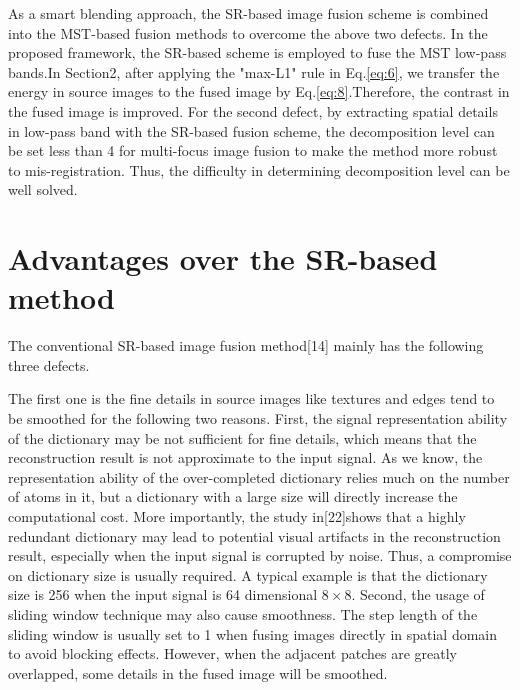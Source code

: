 As a smart blending approach, the SR-based image fusion
scheme is combined into the MST-based fusion methods to
overcome the above two defects. In the proposed framework, the
SR-based scheme is employed to fuse the MST low-pass bands.In
Section2, after applying the "max-L1" rule in Eq.\ref{eq:6}, we transfer the energy in source images to the fused image by Eq.\ref{eq:8}.Therefore, the contrast in the fused image is improved. For the second defect, by extracting spatial details in low-pass band with the SR-based fusion scheme, the decomposition level can be set less than 4 for multi-focus image fusion to make the method more robust to mis-registration. Thus, the difficulty in determining decomposition level can be well solved.

\section{Advantages over the SR-based method}
The conventional SR-based image fusion method[14] mainly
has the following three defects.\hfill \break

The first one is the fine details in source images like textures and edges tend to be smoothed for the following two reasons. First, the signal representation ability of the dictionary may be not sufficient for fine details, which means that the reconstruction result is not approximate to the input signal. As we know, the representation ability of the over-completed dictionary relies much on the number of atoms in it, but a dictionary with a large size will directly increase the computational cost. More importantly, the study in[22]shows that a highly redundant dictionary may lead to potential visual artifacts in the reconstruction result, especially
when the input signal is corrupted by noise. Thus, a compromise on dictionary size is usually required. A typical example is that the dictionary size is 256 when the input signal is 64 dimensional \(8 \times 8\). Second, the usage of sliding window technique may also cause smoothness. The step length of the sliding window is usually set to 1 when fusing images directly in spatial domain to avoid blocking effects. However, when the adjacent patches are greatly overlapped, some details in the fused image will be smoothed. \hfill \break

